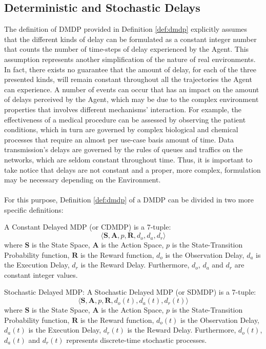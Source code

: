         \subsection{Deterministic and Stochastic Delays}
        \label{sub:dmdp_stochdelays}
            The definition of DMDP provided in Definition \ref{def:dmdp} explicitly assumes that the different kinds of delay can be formulated as a constant integer number that counts the number of time-steps of delay experienced by the Agent. This assumption represents another simplification of the nature of real environments. In fact, there exists no guarantee that the amount of delay, for each of the three presented kinds, will remain constant throughout all the trajectories the Agent can experience. \newline
            A number of events can occur that has an impact on the amount of delays perceived by the Agent, which may be due to the complex environment properties that involves different mechanisms' interaction. For example, the effectiveness of a medical procedure can be assessed by observing the patient conditions, which in turn are governed by complex biological and chemical processes that require an almost per use-case basis amount of time. Data transmission's delays are governed by the rules of queues and traffics on the networks, which are seldom constant throughout time. Thus, it is important to take notice that delays are not constant and a proper, more complex, formulation may be necessary depending on the Environment. 
            \\\\
            For this purpose, Definition \ref{def:dmdp} of a DMDP can be divided in two more specific definitions:
            
            \begin{definition}
                \label{def:cdmdp}
                A Constant Delayed MDP (or CDMDP) is a 7-tuple:
                \[ \langle \mathbf{S}, \mathbf{A}, p, \mathbf{R}, d_o, d_a, d_r \rangle\]
                where $\mathbf{S}$ is the State Space, $\mathbf{A}$ is the Action Space, $p$ is the State-Transition Probability function, $\mathbf{R}$ is the Reward function, $d_o$ is the Observation Delay, $d_a$ is the Execution Delay, $d_r$ is the Reward Delay. Furthermore, $d_o$, $d_a$ and $d_r$ are constant integer values.
            \end{definition}
            
            \begin{definition}{Stochastic Delayed MDP: }
                \label{def:sdmdp}
                A Stochastic Delayed MDP (or SDMDP) is a 7-tuple:
                \[ \langle \mathbf{S}, \mathbf{A}, p, \mathbf{R}, d_o(t), d_a(t), d_r(t) \rangle\]
                where $\mathbf{S}$ is the State Space, $\mathbf{A}$ is the Action Space, $p$ is the State-Transition Probability function, $\mathbf{R}$ is the Reward function, $d_o(t)$ is the Observation Delay, $d_a(t)$ is the Execution Delay, $d_r(t)$ is the Reward Delay. Furthermore, $d_o(t)$, $d_a(t)$ and $d_r(t)$ represents discrete-time stochastic processes.
            \end{definition}
            
